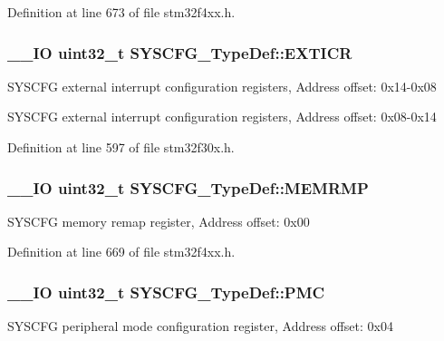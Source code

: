 Definition at line 673 of file stm32f4xx.\-h.

\hypertarget{struct_s_y_s_c_f_g___type_def_a348aafac7a09a6e93e73e5acbccc34d3}{
\subsubsection[{E\-X\-T\-I\-C\-R}]{\setlength{\rightskip}{0pt plus 5cm}\-\_\-\-\_\-\-I\-O {\bf uint32\-\_\-t} S\-Y\-S\-C\-F\-G\-\_\-\-Type\-Def\-::\-E\-X\-T\-I\-C\-R}}\label{struct_s_y_s_c_f_g___type_def_a348aafac7a09a6e93e73e5acbccc34d3}
S\-Y\-S\-C\-F\-G external interrupt configuration registers, Address offset\-: 0x14-\/0x08

S\-Y\-S\-C\-F\-G external interrupt configuration registers, Address offset\-: 0x08-\/0x14 

Definition at line 597 of file stm32f30x.\-h.

\hypertarget{struct_s_y_s_c_f_g___type_def_a85b9d3df2274b730327b181c402a7bf5}{
\subsubsection[{M\-E\-M\-R\-M\-P}]{\setlength{\rightskip}{0pt plus 5cm}\-\_\-\-\_\-\-I\-O {\bf uint32\-\_\-t} S\-Y\-S\-C\-F\-G\-\_\-\-Type\-Def\-::\-M\-E\-M\-R\-M\-P}}\label{struct_s_y_s_c_f_g___type_def_a85b9d3df2274b730327b181c402a7bf5}
S\-Y\-S\-C\-F\-G memory remap register, Address offset\-: 0x00 

Definition at line 669 of file stm32f4xx.\-h.

\hypertarget{struct_s_y_s_c_f_g___type_def_ab5c47c570566cb8ff9d0436c17cc9241}{
\subsubsection[{P\-M\-C}]{\setlength{\rightskip}{0pt plus 5cm}\-\_\-\-\_\-\-I\-O {\bf uint32\-\_\-t} S\-Y\-S\-C\-F\-G\-\_\-\-Type\-Def\-::\-P\-M\-C}}\label{struct_s_y_s_c_f_g___type_def_ab5c47c570566cb8ff9d0436c17cc9241}
S\-Y\-S\-C\-F\-G peripheral mode configuration register, Address offset\-: 0x04 

